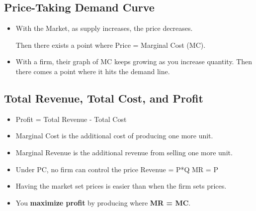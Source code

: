 \documentclass{article}
\begin{document}
\subsection{Price-Taking Demand Curve}
\begin{itemize}
  \item With the Market,
    as supply increases, the price decreases.

    Then there exists a point where Price = Marginal Cost (MC).
  \item With a firm, their graph of MC keeps growing as you increase quantity.
    Then there comes a point where it hits the demand line.
\end{itemize}

\subsection{Total Revenue, Total Cost, and Profit}
\begin{itemize}
  \item Profit = Total Revenue - Total Cost
  \item Marginal Cost is the additional cost of producing one more unit.
  \item Marginal Revenue is the additional revenue from selling one more unit.
  \item Under PC, no firm can control the price \Rightarrow{} Revenue = P*Q \Rightarrow{} MR = P
  \item Having the market set prices is easier than when the firm sets prices.
  \item You \textbf{maximize profit} by producing where \textbf{MR = MC}.
\end{itemize}
\end{document}

